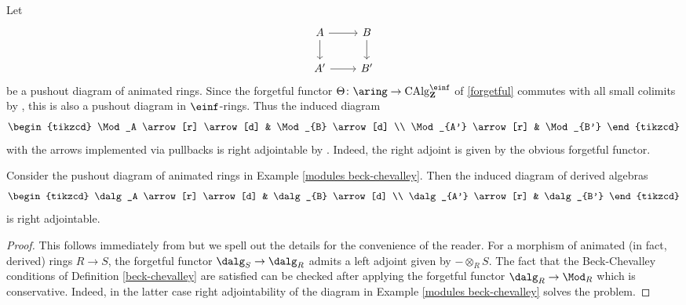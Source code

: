 \documentclass[10pt,reqno]{amsart}
\numberwithin{equation}{section}
\newcommand{\ZZ}{\mathbf{Z}}
\begin{document}
\begin{example}\label{modules beck-chevalley}
    Let $$
\begin{tikzcd}
A \arrow[r] \arrow[d] & B \arrow[d] \\
A' \arrow[r]          & B'         
\end{tikzcd}$$ be a pushout diagram of animated rings. Since the forgetful functor $\Theta\colon \aring \to \mathrm{CAlg}_\ZZ^{\einf}$ of \ref{forgetful} commutes with all small colimits by \cite[Proposition 25.1.2.2]{Lur18}, this is also a pushout diagram in $\einf$-rings. Thus the induced diagram $$
\begin{tikzcd}
\Mod_A \arrow[r] \arrow[d] & \Mod_{B} \arrow[d] \\
\Mod_{A'} \arrow[r]        & \Mod_{B'}         
\end{tikzcd}$$
with the arrows implemented via pullbacks is right adjointable by \cite[Lemma D.3.5.6]{Lur18}. Indeed, the right adjoint is given by the obvious forgetful functor.
\end{example}

\begin{lemma}\label{lem: adjointable dalg}
    Consider the pushout diagram of animated rings in Example \ref{modules beck-chevalley}. Then the induced diagram of derived algebras $$
\begin{tikzcd}
\dalg_A \arrow[r] \arrow[d] & \dalg_{B} \arrow[d] \\
\dalg_{A'} \arrow[r]        & \dalg_{B'}         
\end{tikzcd}$$ is right adjointable. 
\end{lemma}

\begin{proof}
This follows immediately from \cite[Remark 4.2.29]{Rak20} but we spell out the details for the convenience of the reader.
For a morphism of animated (in fact, derived) rings $R\to S$, the forgetful functor $\dalg_S\to \dalg_R$ admits a left adjoint given by $-\otimes_R S$. The fact that the Beck-Chevalley conditions of Definition \ref{beck-chevalley} are satisfied can be checked after applying the forgetful functor $\dalg_R\to \Mod_R$ which is conservative. Indeed, in the latter case right adjointability of the diagram in Example \ref{modules beck-chevalley} solves the problem.   
\end{proof}
\end{document}
